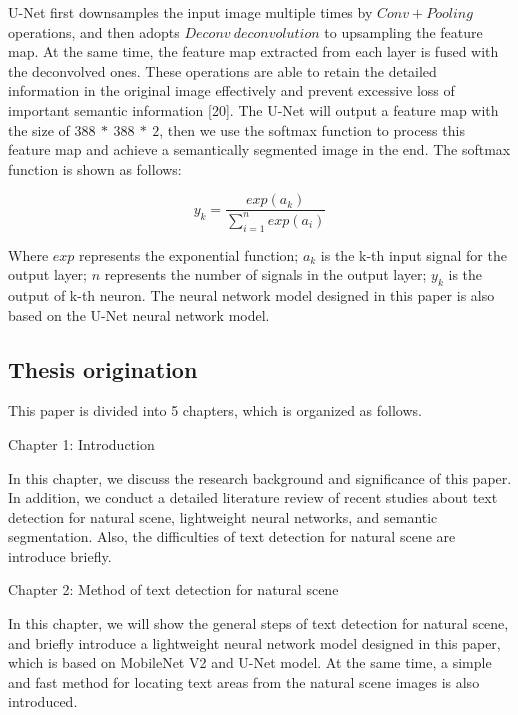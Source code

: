 \documentclass[22pt, UTF8]{article}
\numberwithin{figure}{section}
\numberwithin{table}{section}
\numberwithin{equation}{section} %
\begin{document}
\setlength\parindent{2em} U-Net first downsamples the input image multiple times by $Conv + Pooling$ operations, and then adopts $Deconv\ deconvolution$ to upsampling the feature map. At the same time, the feature map extracted from each layer is fused with the deconvolved ones. These operations are able to retain the detailed information in the original image effectively and prevent excessive loss of important semantic information [20]. The U-Net will output a feature map with the size of $388\ *\ 388\ *\ 2$, then we use the softmax function to process this feature map and achieve a semantically segmented image in the end. The softmax function is shown as follows:

\vspace{-2mm} %
\begin{equation} %
y_{k} = \frac{exp(a_{k})}{\sum\limits_{i = 1}^{n}exp(a_{i})}
\end{equation}

\vspace{2mm} %

\noindent Where $exp$ represents the exponential function; $a_{k}$ is the k-th input signal for the output layer; $n$ represents the number of signals in the output layer; $y_{k}$ is the output of k-th neuron. The neural network model designed in this paper is also based on the U-Net neural network model.

\subsection{Thesis origination}

\setlength\parindent{2em} This paper is divided into 5 chapters, which is organized as follows.

\setlength\parindent{2em} Chapter 1: Introduction

\setlength\parindent{2em} In this chapter, we discuss the research background and significance of this paper. In addition, we conduct a detailed literature review of recent studies about text detection for natural scene, lightweight neural networks, and semantic segmentation. Also, the difficulties of text detection for natural scene are introduce briefly.

\setlength\parindent{2em} Chapter 2: Method of text detection for natural scene

\setlength\parindent{2em} In this chapter, we will show the general steps of text detection for natural scene, and briefly introduce a lightweight neural network model designed in this paper, which is based on MobileNet V2 and U-Net model. At the same time, a simple and fast method for locating text areas from the natural scene images is also introduced.
\end{document}
